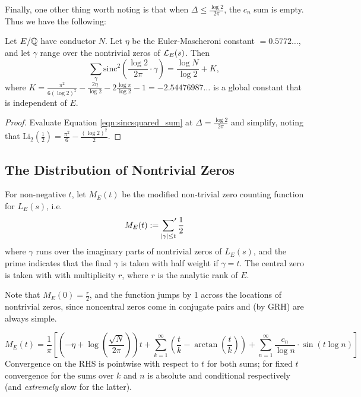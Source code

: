 \documentclass[10pt]{article}
\newcommand{\pr}{^{\prime}}
\newcommand{\Les}{L_E(s)}
\newcommand{\sinc}{\text{sinc}}
\newcommand{\Li}{\text{Li}}
\begin{document}
Finally, one other thing worth noting is that when $\Delta \le \frac{\log 2}{2\pi}$, the $c_n$ sum is empty. Thus we have the following:
\begin{corollary}
Let $E/\mathbb{Q}$ have conductor $N$. Let $\eta$ be the Euler-Mascheroni constant $=0.5772\ldots$, and let $\gamma$ range over the nontrivial zeros of $\mathcal{L}_E(s)$. Then
\begin{equation}
\sum_{\gamma} \sinc^2\left(\frac{\log 2}{2\pi} \cdot \gamma \right) = \frac{\log N}{\log 2} + K,
\end{equation}
where $K = \frac{\pi^2}{6(\log 2)^2} - \frac{2\eta}{\log 2} - 2\frac{\log \pi}{\log 2} - 1 = -2.54476987\ldots$ is a global constant that is independent of $E$.
\end{corollary}
\begin{proof}
Evaluate Equation \ref{eqn:sincsquared_sum} at $\Delta = \frac{\log 2}{2\pi}$ and simplify, noting that $\Li_2\left(\frac{1}{2}\right) = \frac{\pi^2}{6} - \frac{(\log 2)^2}{2}$.
\end{proof}

\newpage
\subsection{The Distribution of Nontrivial Zeros}

\begin{definition}
For non-negative $t$, let $M_E(t)$ be the modified non-trivial zero counting function for $\Les$, i.e.
\begin{equation}
M_E(t) := \sideset{}{\pr}\sum_{|\gamma| \le t} \frac{1}{2}
\end{equation}
where $\gamma$ runs over the imaginary parts of nontrivial zeros of $L_E(s)$, and the prime indicates that the final $\gamma$ is taken with half weight if $\gamma = t$. The central zero is taken with with multiplicity $r$, where $r$ is the analytic rank of $E$. \\
\end{definition}

Note that $M_E(0) = \frac{r}{2}$, and the function jumps by 1 across the locations of nontrivial zeros, since noncentral zeros come in conjugate pairs and (by GRH) are always simple. \\

\begin{proposition}[S.]
\begin{equation}\label{eqn:M_E(t)}
M_E(t) = \frac{1}{\pi}\left[\left(-\eta+\log\left(\frac{\sqrt{N}}{2\pi}\right)\right) t + \sum_{k=1}^{\infty} \left(\frac{t}{k} - \arctan\left(\frac{t}{k}\right)\right) + \sum_{n=1}^{\infty} \frac{c_n}{\log n}\cdot \sin(t\log n)\right]
\end{equation}
Convergence on the RHS is pointwise with respect to $t$ for both sums; for fixed $t$ convergence for the sums over $k$ and $n$ is absolute and conditional respectively (and {\it extremely} slow for the latter).
\end{proposition}
\end{document}
